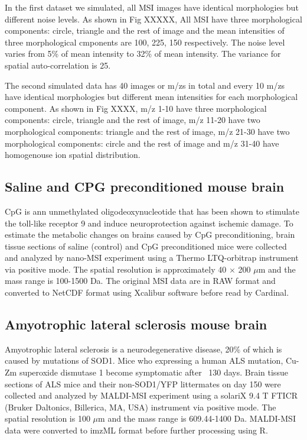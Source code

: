 \documentclass{bioinfo}
\begin{document}
In the first dataset we simulated, all MSI images have identical morphologies but different noise levels. As shown in Fig XXXXX, All MSI have three morphological components: circle, triangle and the rest of image and the mean intensities of three morphological cmponents are 100, 225, 150 respectively. The noise level varies from 5\% of mean intensity to 32\% of mean intensity. The variance for spatial auto-correlation is 25.



The second simulated data has 40 images or m/zs in total and every 10 m/zs have identical morphologies but different mean intensities for each morphological component. As shown in Fig XXXX, m/z 1-10 have three morphological components: circle, triangle and the rest of image, m/z 11-20 have two morphological components: triangle and the rest of image, m/z 21-30 have two morphological components: circle and the rest of image and m/z 31-40  have homogenouse ion spatial distribution.

\subsection{Saline and CPG preconditioned mouse brain}
CpG is ann unmethylated oligodeoxynucleotide that has been shown to stimulate the toll-like receptor 9 and induce neuroprotection against ischemic damage. To estimate the metabolic changes on brains caused by CpG preconditioning, brain tissue sections of saline (control) and CpG preconditioned mice were collected and analyzed by nano-MSI experiment using a Thermo LTQ-orbitrap instrument via positive mode. The spatial resolution is approximately 40 $\times$ 200 $\mu$m and the mass range is 100-1500 Da. The original MSI data are in RAW format and converted to NetCDF format using Xcalibur software before read by Cardinal.
\subsection{Amyotrophic lateral sclerosis mouse brain}
Amyotrophic lateral sclerosis is a neurodegenerative disease, 20\% of which is caused by mutations of SOD1. Mice who expressing a human ALS mutation, Cu-Zm superoxide dismutase 1 become symptomatic after ~130 days. Brain tissue sections of ALS mice and their non-SOD1/YFP littermates on day 150 were collected and analyzed by MALDI-MSI experiment using a solariX 9.4 T FTICR
(Bruker Daltonics, Billerica, MA, USA) instrument via positive mode. The spatial resolution is 100 $\mu$m and the mass range is 609.44-1400 Da. MALDI-MSI data were converted to imzML format before further processing using R.
\end{document}

